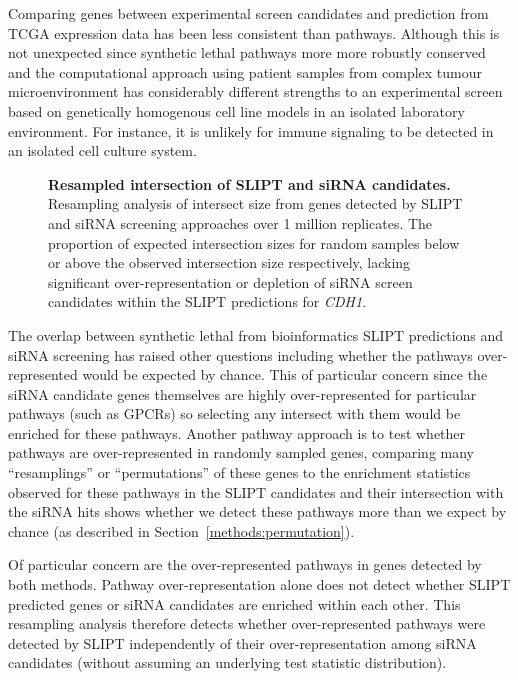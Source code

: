 Comparing genes between experimental screen candidates and prediction from TCGA expression data has been less consistent than pathways. Although this is not unexpected since synthetic lethal pathways more more robustly conserved \citep{Dixon2008} and the computational approach using patient samples from complex tumour microenvironment has considerably different strengths to an experimental screen \citep{Telford2015} based on genetically homogenous cell line models in an isolated laboratory environment. For instance, it is unlikely for immune signaling to be detected in an isolated cell culture system.

\begin{figure}[!ht]
\begin{mdframed}
  \centering
   \caption[Resampled intersection of SLIPT and siRNA candidates]{\small \textbf{Resampled intersection of \gls{SLIPT} and siRNA candidates.} Resampling analysis of intersect size from genes detected by \gls{SLIPT} and siRNA screening approaches over 1 million replicates. The proportion of expected intersection sizes for random samples below or above the observed intersection size respectively, lacking significant over-represent\-ation or depletion of siRNA screen candidates within the \gls{SLIPT} predictions for \textit{CDH1}.
}
\label{fig:perm_sample}
\end{mdframed}
\end{figure}

The overlap between synthetic lethal from bioinformatics \gls{SLIPT} predictions and siRNA screening has raised other questions including whether the pathways over-represented would be expected by chance. This of particular concern since the siRNA candidate genes themselves are highly over-represented for particular pathways (such as GPCRs) so selecting any intersect with them would be enriched for these pathways. Another pathway approach is to test whether pathways are over-represented in randomly sampled genes, comparing many ``resamplings'' or ``permutations'' of these genes to the enrichment statistics observed for these pathways in the \gls{SLIPT} candidates and their intersection with the siRNA hits shows whether we detect these pathways more than we expect by chance (as described in Section~\ref{methods:permutation}). 

Of particular concern are the over-represented pathways in genes detected by both methods. Pathway over-representation alone does not detect whether \gls{SLIPT} predicted genes or siRNA candidates are enriched within each other. This resampling analysis therefore detects whether over-represented pathways were detected by \gls{SLIPT} independently of their over-representation among siRNA candidates (without assuming an underlying test statistic distribution).

